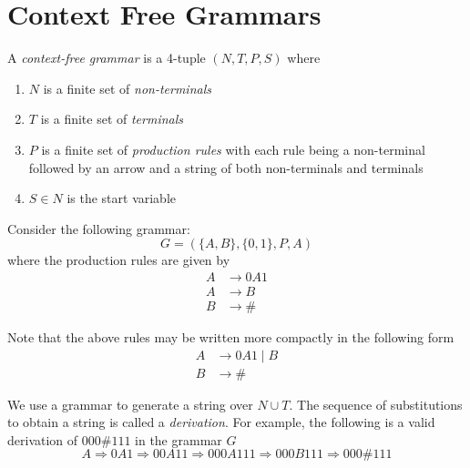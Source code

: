 \newcommand{\derives}{\overset{*}{\Rightarrow}}
\newcommand{\lderives}{\overset{lm*}{\Rightarrow}}
\newcommand{\rderives}{\overset{rm*}{\Rightarrow}}
\section{Context Free Grammars}
\begin{definition}
    A \textit{context-free grammar} is a 4-tuple $(N, T, P, S)$ where 
    \begin{enumerate}
        \item $N$ is a finite set of \textit{non-terminals}
        \item $T$ is a finite set of \textit{terminals}
        \item $P$ is a finite set of \textit{production rules} with each rule being a non-terminal followed by an arrow and a string of both non-terminals and terminals
        \item $S\in N$ is the start variable
    \end{enumerate}
\end{definition}

Consider the following grammar:
\begin{equation*}
    G = (\{A, B\}, \{0, 1\}, P, A)
\end{equation*}
where the production rules are given by
\begin{align*}
    A &\rightarrow 0A1\\
    A &\rightarrow B\\
    B &\rightarrow \#
\end{align*}

Note that the above rules may be written more compactly in the following form
\begin{align*}
    A &\rightarrow 0A1\mid B\\
    B &\rightarrow\#
\end{align*}

We use a grammar to generate a string over $N\cup T$. The sequence of substitutions to obtain a string is called a \textit{derivation}. For example, the following is a valid derivation of $000\#111$ in the grammar $G$
\begin{equation*}
    A\Rightarrow 0A1\Rightarrow 00A11\Rightarrow 000A111\Rightarrow 000B111\Rightarrow 000\#111
\end{equation*}

